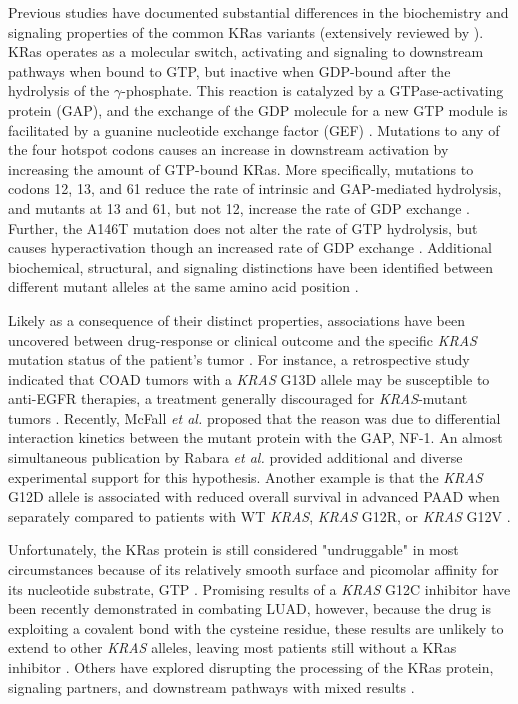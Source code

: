\documentclass[english, 12pt, letterpaper]{article}
\newcommand{\KRAS}{\emph{KRAS}}
\newcommand{\kras}{KRas}
\begin{document}
Previous studies have documented substantial differences in the biochemistry and signaling properties of the common \kras{} variants (extensively reviewed by \cite{Miller2012, Li2018}).
\kras{} operates as a molecular switch, activating and signaling to downstream pathways when bound to GTP, but inactive when GDP-bound after the hydrolysis of the $\gamma$-phosphate.
This reaction is catalyzed by a GTPase-activating protein (GAP), and the exchange of the GDP molecule for a new GTP module is facilitated by a guanine nucleotide exchange factor (GEF) \cite{Barbacid1987}.
Mutations to any of the four hotspot codons causes an increase in downstream activation by increasing the amount of GTP-bound \kras{}.
More specifically, mutations to codons 12, 13, and 61 reduce the rate of intrinsic and GAP-mediated hydrolysis, and mutants at 13 and 61, but not 12, increase the rate of GDP exchange \cite{Hunter2015a, Smith2013}.
Further, the A146T mutation does not alter the rate of GTP hydrolysis, but causes hyperactivation though an increased rate of GDP exchange \cite{Edkins2006, Janakiraman2010, Poulin2019}.
Additional biochemical, structural, and signaling distinctions have been identified between different mutant alleles at the same amino acid position \cite{Poulin2019, Hobbs2019AtypicalCancer., Hunter2015a, Li2018, Yu2018, Kovalski2019, Ihle2012, Spoerner2004, Smith2014a, Pantsar2018}.

Likely as a consequence of their distinct properties, associations have been uncovered between drug-response or clinical outcome and the specific \KRAS{} mutation status of the patient's tumor \cite{Haigis2017, Li2018}.
For instance, a retrospective study indicated that COAD tumors with a \KRAS{} G13D allele may be susceptible to anti-EGFR therapies, a treatment generally discouraged for \KRAS{}-mutant tumors \cite{DeRoock2010}. 
Recently, McFall \emph{et al.} \cite{McFall2019} proposed that the reason was due to differential interaction kinetics between the mutant protein with the GAP, NF-1.
An almost simultaneous publication by Rabara \emph{et al.} \cite{Rabara2019} provided additional and diverse experimental support for this hypothesis.
Another example is that the \KRAS{} G12D allele is associated with reduced overall survival in advanced PAAD when separately compared to patients with WT \KRAS{}, \KRAS{} G12R, or \KRAS{} G12V \cite{Bournet2016}.

Unfortunately, the \kras{} protein is still considered "undruggable" in most circumstances because of its relatively smooth surface and picomolar affinity for its nucleotide substrate, GTP \cite{Spencer-Smith2019}.
Promising results of a \KRAS{} G12C inhibitor have been recently demonstrated in combating LUAD, however, because the drug is exploiting a covalent bond with the cysteine residue, these results are unlikely to extend to other \KRAS{} alleles, leaving most patients still without a \kras{} inhibitor \cite{Lim2014,Ostrem2013, Patricelli2016, Lito2016, Canon2019}.
Others have explored disrupting the processing of the \kras{} protein, signaling partners, and downstream pathways with mixed results \cite{Spencer-Smith2019, Zeitouni2016}.
\end{document}
